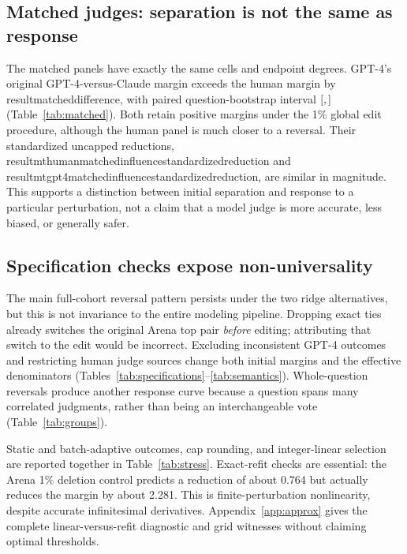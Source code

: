 \documentclass{article}
\newcommand{\R}[1]{\csname result#1\endcsname}
\begin{document}
\subsection{Matched judges: separation is not the same as response}
The matched panels have exactly the same cells and endpoint degrees. GPT-4's original GPT-4-versus-Claude margin exceeds the human margin by \R{matcheddifference}, with paired question-bootstrap interval $[\R{matchedbootstrapcilow},\R{matchedbootstrapcihigh}]$ (Table~\ref{tab:matched}). Both retain positive margins under the 1\% global edit procedure, although the human panel is much closer to a reversal. Their standardized uncapped reductions, \R{mthumanmatchedinfluencestandardizedreduction} and \R{mtgpt4matchedinfluencestandardizedreduction}, are similar in magnitude. This supports a distinction between initial separation and response to a particular perturbation, not a claim that a model judge is more accurate, less biased, or generally safer.

\begin{table}[t]
\centering\small
\caption{Common MT cells, equal cell weighting, same fixed GPT-4-versus-Claude target. U and C margins follow nominal 1\% \emph{cell} reversals. Cell costs are not interchangeable with full-release judgment costs. Original intervals use synchronized question bootstrap draws.}\label{tab:matched}


\end{table}

\subsection{Specification checks expose non-universality}
The main full-cohort reversal pattern persists under the two ridge alternatives, but this is not invariance to the entire modeling pipeline. Dropping exact ties already switches the original Arena top pair \emph{before} editing; attributing that switch to the edit would be incorrect. Excluding inconsistent GPT-4 outcomes and restricting human judge sources change both initial margins and the effective denominators (Tables~\ref{tab:specifications}--\ref{tab:semantics}). Whole-question reversals produce another response curve because a question spans many correlated judgments, rather than being an interchangeable vote (Table~\ref{tab:groups}).

Static and batch-adaptive outcomes, cap rounding, and integer-linear selection are reported together in Table~\ref{tab:stress}. Exact-refit checks are essential: the Arena 1\% deletion control predicts a reduction of about 0.764 but actually reduces the margin by about 2.281. This is finite-perturbation nonlinearity, despite accurate infinitesimal derivatives. Appendix~\ref{app:approx} gives the complete linear-versus-refit diagnostic and grid witnesses without claiming optimal thresholds.
\end{document}
